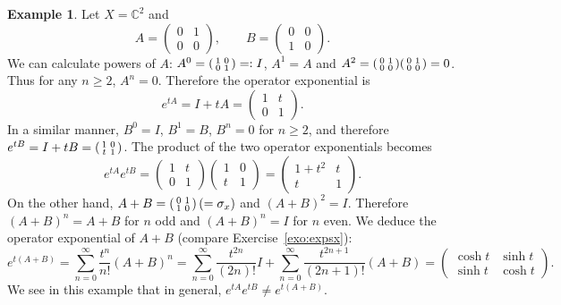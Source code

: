 \documentclass[11pt,a4paper]{article}
\numberwithin{equation}{section}
\newcommand{\C}{\mathbb{C}}
\theoremstyle{plain}
\theoremstyle{definition}
\newtheorem{example}[theorem]{Example}
\theoremstyle{plain}
\theoremstyle{definition}
\begin{document}
\begin{example}\label{ex:noncomm}
Let $X=\C^2$ and
\[
A=\begin{pmatrix}0&1\\0&0\end{pmatrix},\qquad B=\begin{pmatrix}0&0\\1&0\end{pmatrix}.
\]
We can calculate powers of $A$:
$A^0=\begin{psmallmatrix}1&0\\0&1\end{psmallmatrix}=:I$, $A^1=A$ and
$A^2=\begin{psmallmatrix}0&1\\0&0\end{psmallmatrix}\begin{psmallmatrix}0&1\\0&0\end{psmallmatrix}=0$.
Thus for any $n\ge2$, $A^n=0$. Therefore the operator exponential is
\[
e^{tA}=I+tA=\begin{pmatrix}1&t\\0&1\end{pmatrix}.
\]
In a similar manner, $B^0=I$, $B^1=B$, $B^n=0$ for $n\ge2$, and therefore
$e^{tB}=I+tB=\begin{psmallmatrix}1&0\\t&1\end{psmallmatrix}$. The product of the two
operator exponentials becomes
\[
e^{tA}e^{tB}=\begin{pmatrix}1&t\\0&1\end{pmatrix}\begin{pmatrix}1&0\\t&1\end{pmatrix}
=\begin{pmatrix}1+t^2&t\\t&1\end{pmatrix}.
\]
On the other hand, $A+B=\begin{psmallmatrix}0&1\\1&0\end{psmallmatrix}\,(=\sigma_x)$ and
$(A+B)^2=I$. Therefore $(A+B)^n=A+B$ for $n$ odd and $(A+B)^n=I$ for $n$ even. We deduce
the operator exponential of $A+B$ (compare Exercise~\ref{exo:expsx}):
\[
e^{t(A+B)}=\sum_{n=0}^\infty\frac{t^n}{n!}(A+B)^n=\sum_{n=0}^\infty\frac{t^{2n}}{(2n)!}I
+\sum_{n=0}^\infty\frac{t^{2n+1}}{(2n+1)!}(A+B)=\begin{pmatrix}\cosh t&\sinh t\\\sinh t&\cosh t\end{pmatrix}.
\]
We see in this example that in general, $e^{tA}e^{tB}\ne e^{t(A+B)}$.
\end{example}
\end{document}
